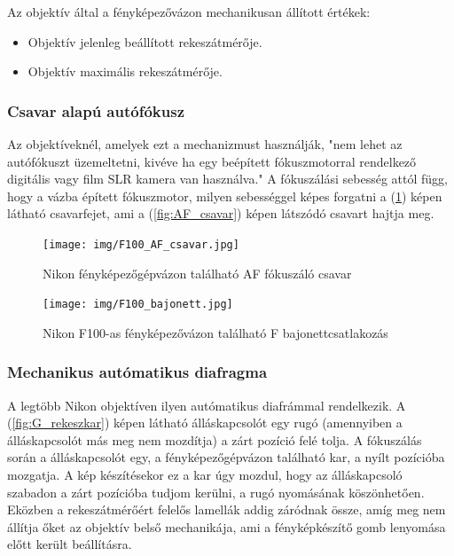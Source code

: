 Az objektív által a fényképezővázon mechanikusan állított értékek:
\begin{itemize}
    \item Objektív jelenleg beállított rekeszátmérője. \cite{Lens_naming}
    \item Objektív maximális rekeszátmérője. \cite{Lens_naming}
\end{itemize}

\subsubsection{Csavar alapú autófókusz}

Az objektíveknél, amelyek ezt a mechanizmust használják, "nem lehet az autófókuszt üzemeltetni, kivéve ha egy beépített fókuszmotorral rendelkező digitális vagy film SLR kamera van használva." A fókuszálási sebesség attól függ, hogy a vázba épített fókuszmotor, milyen sebességgel képes forgatni a (\ref{fig:F100_AF_csavar}) képen látható csavarfejet, ami a (\ref{fig:AF_csavar}) képen látszódó csavart hajtja meg.

\begin{figure}[H]
	\centering
	\texttt{[image: img/F100\_AF\_csavar.jpg]}
	\caption{Nikon fényképezőgépvázon található AF fókuszáló csavar}
	\label{fig:F100_AF_csavar}
\end{figure}


\begin{figure}[H]
	\centering
	\texttt{[image: img/F100\_bajonett.jpg]}
	\caption{Nikon F100-as fényképezővázon található F bajonettcsatlakozás}
	\label{fig:F_bajonett}
\end{figure}

\subsubsection{Mechanikus autómatikus diafragma}
A legtöbb Nikon objektíven ilyen autómatikus diafrámmal rendelkezik.
A (\ref{fig:G_rekeszkar}) képen látható álláskapcsolót egy rugó (amennyiben a álláskapcsolót más meg nem mozdítja) a zárt pozíció felé tolja.
A fókuszálás során a álláskapcsolót egy, a fényképezőgépvázon található kar, a nyílt pozícióba mozgatja.
A kép készítésekor ez a kar úgy mozdul, hogy az álláskapcsoló szabadon a zárt pozícióba tudjom kerülni, a rugó nyomásának köszönhetően.
Eközben a rekeszátmérőért felelős lamellák addig záródnak össze, amíg meg nem állítja őket az objektív belső mechanikája, ami a fényképkészítő gomb lenyomása előtt került beállításra.

